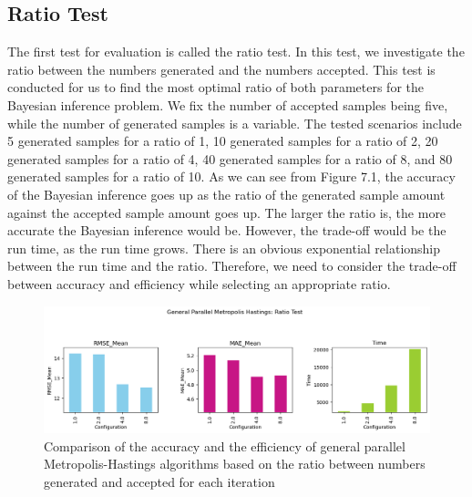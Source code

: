 \subsection{Ratio Test}
The first test for evaluation is called the ratio test. In this test, we investigate the ratio between the numbers generated and the numbers accepted. This test is conducted for us to find the most optimal ratio of both parameters for the Bayesian inference problem. We fix the number of accepted samples being five, while the number of generated samples is a variable. The tested scenarios include 5 generated samples for a ratio of 1, 10 generated samples for a ratio of 2, 20 generated samples for a ratio of 4, 40 generated samples for a ratio of 8, and 80 generated samples for a ratio of 10. As we can see from Figure 7.1, the accuracy of the Bayesian inference goes up as the ratio of the generated sample amount against the accepted sample amount goes up. The larger the ratio is, the more accurate the Bayesian inference would be. However, the trade-off would be the run time, as the run time grows. There is an obvious exponential relationship between the run time and the ratio. Therefore, we need to consider the trade-off between accuracy and efficiency while selecting an appropriate ratio.

\begin{figure}[H]
    \centering
    \includegraphics[width=1\textwidth]{figures/gpmh/ratio_test.png}
    \captionsetup{width=.8\textwidth}
    \caption{Comparison of the accuracy and the efficiency of general parallel Metropolis-Hastings algorithms based on the ratio between numbers generated and accepted for each iteration}
    \label{fig:enter-label}
\end{figure}

